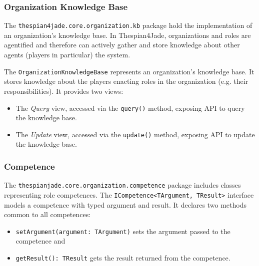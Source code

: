 \subsubsection{Organization Knowledge Base}

The \texttt{thespian4jade.core.organization.kb} package hold the implementation of an organization's knowledge base.
In Thespian4Jade, organizations and roles are agentified and therefore can actively gather and store knowledge about other agents (players in particular) the system.

The \texttt{OrganizationKnowledgeBase} represents an organization's knowledge base.
It stores knowledge about the players enacting roles in the organization (e.g. their responsibilities).
It provides two views:
\begin{itemize}
	\item The \textit{Query} view, accessed via the \texttt{query()} method, exposing API to query the knowledge base.
	\item The \textit{Update} view, accessed via the \texttt{update()} method, exposing API to update the knowledge base.
\end{itemize}

\subsubsection{Competence}

The \texttt{thespianjade.core.organization.competence} package includes classes representing role competences.
The \texttt{ICompetence<TArgument, TResult>} interface models a competence with typed argument and result.
It declares two methods common to all competences:
\begin{itemize}
	\item \texttt{setArgument(argument: TArgument)} sets the argument passed to the competence and
	\item \texttt{getResult(): TResult} gets the result returned from the competence.
\end{itemize}

